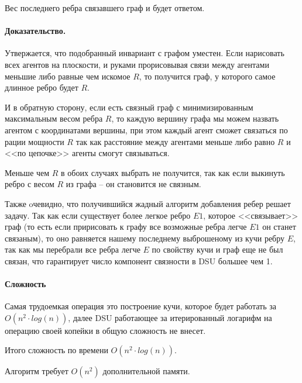 \documentclass[12pt]{article}
\begin{document}
Вес последнего ребра связавшего граф и будет ответом.




\paragraph{Доказательство.}
Утвержается, что подобранный инвариант с графом уместен.
Если нарисовать всех агентов на плоскости, и руками
прорисовывая связи между агентами меньшие либо равные чем искомое $ R $,
то получится граф, у которого самое длинное ребро будет $ R $.

И в обратную сторону, если есть связный граф с минимизированным
максимальным весом ребра $ R $, то каждую вершину графа мы можем
назвать агентом с координатами вершины, при этом каждый агент сможет
связаться по рации мощности $ R $ так как расстояние между агентами
меньше либо равно $ R $ и <<по цепочке>> агенты смогут связываться.

Меньше чем $ R $ в обоих случаях выбрать не получится, так как
если выкинуть ребро с весом $ R $ из графа -- он становится не связным.

Также oчевидно, что получившийся жадный алгоритм добавления ребер решает задачу.
Так как если существует более легкое ребро $ E1 $, которое <<связывает>> граф
(то есть если пририсовать к графу все возможные ребра легче $ E1 $ он станет
связаным), то оно равняется нашему последнему выброшеному из кучи ребру $ E $,
так как мы перебрали все ребра легче $ E $ по свойству кучи и граф еще не был
связан, что гарантирует число компонент связности в DSU большее чем 1.




\paragraph{Сложность}
Самая трудоемкая операция это построение кучи, которое будет работать
за $ O(n^2 \cdot log(n)) $, далее DSU работающее за итерированный логарифм
на операцию своей копейки в общую сложность не внесет.

Итого сложность по времени $ O(n^2 \cdot log(n)) $.

Алгоритм требует $ O(n^2) $ дополнительной памяти.
\end{document}
